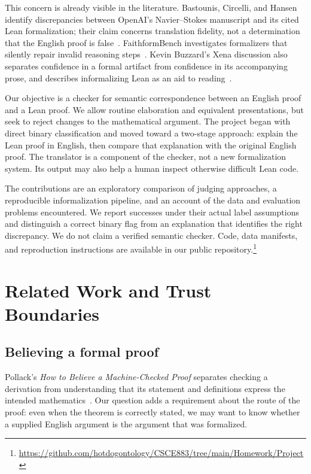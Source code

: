 \documentclass[sigconf,nonacm]{acmart}
\begin{document}
This concern is already visible in the literature. Bastounis, Circelli, and Hansen identify discrepancies between OpenAI's Navier--Stokes manuscript and its cited Lean formalization; their claim concerns translation fidelity, not a determination that the English proof is false~\cite{navierstokes}. FaithformBench investigates formalizers that silently repair invalid reasoning steps~\cite{faithform}. Kevin Buzzard's Xena discussion also separates confidence in a formal artifact from confidence in its accompanying prose, and describes informalizing Lean as an aid to reading~\cite{xena}.

Our objective is a checker for semantic correspondence between an English proof and a Lean proof. We allow routine elaboration and equivalent presentations, but seek to reject changes to the mathematical argument. The project began with direct binary classification and moved toward a two-stage approach: explain the Lean proof in English, then compare that explanation with the original English proof. The translator is a component of the checker, not a new formalization system. Its output may also help a human inspect otherwise difficult Lean code.

The contributions are an exploratory comparison of judging approaches, a reproducible informalization pipeline, and an account of the data and evaluation problems encountered. We report successes under their actual label assumptions and distinguish a correct binary flag from an explanation that identifies the right discrepancy. We do not claim a verified semantic checker. Code, data manifests, and reproduction instructions are available in our public repository.\footnote{\url{https://github.com/hotdogontology/CSCE883/tree/main/Homework/Project}}

\section{Related Work and Trust Boundaries}
\subsection{Believing a formal proof}
Pollack's \emph{How to Believe a Machine-Checked Proof} separates checking a derivation from understanding that its statement and definitions express the intended mathematics~\cite{pollack}. Our question adds a requirement about the route of the proof: even when the theorem is correctly stated, we may want to know whether a supplied English argument is the argument that was formalized.
\end{document}
